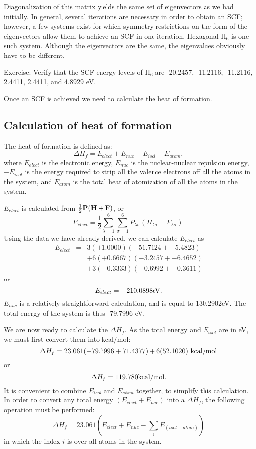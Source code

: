 Diagonalization of this matrix yields the same set of eigenvectors as we had
initially. In general, several iterations are necessary in order to obtain an
SCF; however, a few systems exist for which symmetry restrictions on the form
of the eigenvectors allow them to achieve an SCF in one iteration. Hexagonal
H$_6$ is one such system. Although the eigenvectors are the same, the
eigenvalues obviously have to be different.

Exercise: Verify that the SCF energy levels of H$_6$ are -20.2457, -11.2116,
-11.2116, 2.4411, 2.4411, and 4.8929 eV.

Once an SCF is achieved we need to calculate the heat of formation.

\subsection{Calculation of heat of formation}

The heat of formation is defined as:
$$
 \Delta H_f = E_{elect} + E_{nuc}-E_{isol}+E_{atom},
$$
where $E_{elect}$ is the electronic energy, $E_{nuc}$ is the
nuclear-nuclear repulsion energy, $-E_{isol}$ is the energy
required to strip all the valence electrons off all the
atoms in the system, and $E_{atom}$ is the total heat of
atomization of all the atoms in the system.

$E_{elect}$ is calculated from  $\frac{1}{2}{\bf P(H + F)}$, or
$$
E_{elect} = \frac{1}{2}\sum_{\lambda=1}^6\sum_{\sigma=1}^6P_{\lambda\sigma}(H_{\lambda\sigma} + F_{\lambda\sigma}).
$$
Using the data we have already derived, we can calculate $E_{elect}$ as
\begin{eqnarray}
   E_{elect} & = &  3(+1.0000)(-51.7124 + -5.4823)   \nonumber  \\
             &   &+ 6(+0.6667)( -3.2457 + -6.4652)   \nonumber  \\
             &   &+ 3(-0.3333)( -0.6992 + -0.3611)   \nonumber
\end{eqnarray}
or
$$
   E_{elect}  = -210.0898 {\rm eV}.
$$
$E_{nuc}$ is a relatively straightforward calculation, and is
equal to 130.2902eV. The total energy of the system is thus
-79.7996 eV.

We are now ready to calculate the $\Delta H_f$. As the total energy and
$E_{isol}$ are in eV, we must first convert them into kcal/mol:
$$
 \Delta H_f = 23.061( -79.7996 + 71.4377) + 6(52.1020){\rm \ kcal/mol}
$$
or
$$
\Delta H_f= 119.780{\rm  kcal/mol}.
$$
It is convenient to combine $E_{isol}$ and $E_{atom}$ together, to simplify
this calculation. In order to convert any total energy $(E_{elect} + E_{nuc})$
into a $\Delta H_f$, the following operation must be performed:
$$
\Delta H_f = 23.061(E_{elect} + E_{nuc}  -\sum_i E_{(isol-atom)}  )
$$
in which the index $i$ is over all atoms in the system.

